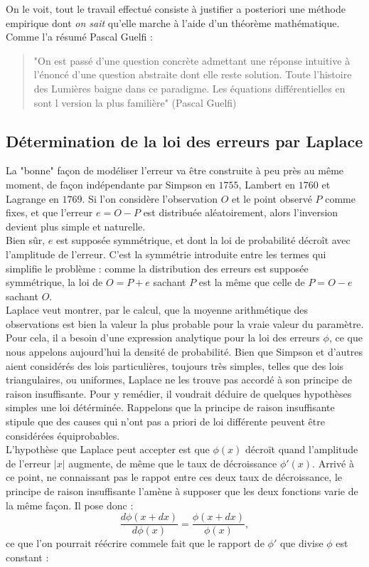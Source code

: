 \documentclass{article}
\begin{document}
On le voit, tout le travail effectué consiste à justifier a posteriori une méthode empirique dont \textit{on sait} qu'elle marche à l'aide d'un théorème mathématique. Comme l'a résumé Pascal Guelfi :
\begin{quotation}
"On est passé d'une question concrète admettant une réponse intuitive à l'énoncé d'une question abstraite dont elle reste solution. Toute l'histoire des Lumières baigne dans ce paradigme. Les équations différentielles en sont l version la plus familière" (Pascal Guelfi)
\end{quotation}

\subsection{Détermination de la loi des erreurs par Laplace}

La "bonne" façon de modéliser l'erreur va être construite à peu près au même moment, de façon indépendante par Simpson en $1755$, Lambert en $1760$ et Lagrange en $1769$. Si l'on considère l'observation $O$ et le point observé $P$ comme fixes, et que l'erreur $e=O-P$ est distribuée aléatoirement, alors l'inversion devient plus simple et naturelle. \\

Bien sûr, $e$ est supposée symmétrique, et dont la loi de probabilité décroît avec l'amplitude de l'erreur. C'est la symmétrie introduite entre les termes qui simplifie le problème : comme la distribution des erreurs est supposée symmétrique, la loi de $O=P+e$ sachant $P$ est la même que celle de $P=O-e$ sachant $O$. \\

Laplace veut montrer, par le calcul, que la moyenne arithmétique des observations est bien la valeur la plus probable pour la vraie valeur du paramètre. Pour cela, il a besoin d'une expression analytique pour la loi des erreurs $\phi$, ce que nous appelons aujourd'hui la densité de probabilité. Bien que Simpson et d'autres aient considérés des lois particulières, toujours très simples, telles que des lois triangulaires, ou uniformes, Laplace ne les trouve pas accordé à son principe de raison insuffisante. Pour y remédier, il voudrait déduire de quelques hypothèses simples une loi détérminée. Rappelons que la principe de raison insuffisante stipule que des causes qui n'ont pas a priori de loi différente peuvent être considérées équiprobables.\\

L'hypothèse que Laplace peut accepter est que $\phi(x)$ décroït quand l'amplitude de l'erreur $|x|$ augmente, de même que le taux de décroissance $\phi'(x)$. Arrivé à ce point, ne connaissant pas le rappot entre ces deux taux de décroissance, le principe de raison insuffisante l'amène à supposer que les deux fonctions varie de la même façon. Il pose donc :
\[\frac{d\phi(x+dx)}{d\phi(x)}=\frac{\phi(x+dx)}{\phi(x)},\]
ce que l'on pourrait réécrire commele fait que le rapport de $\phi'$ que divise $\phi$ est constant :
\end{document}
